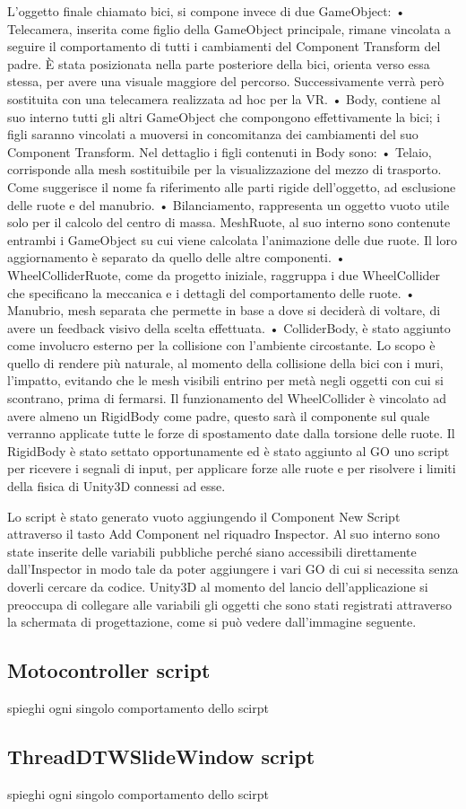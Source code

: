 L’oggetto finale chiamato bici, si compone invece di due GameObject:
• Telecamera, inserita come figlio della GameObject principale, rimane vincolata a seguire il comportamento di tutti i cambiamenti del Component Transform del padre.
È stata posizionata nella parte posteriore della bici, orienta verso essa stessa, per avere una visuale maggiore del percorso. Successivamente verrà però sostituita con una telecamera realizzata ad hoc per la VR.
• Body, contiene al suo interno tutti gli altri GameObject che compongono effettivamente la bici; i figli saranno vincolati a muoversi in concomitanza dei cambiamenti del suo Component Transform.
Nel dettaglio i figli contenuti in Body sono:
• Telaio, corrisponde alla mesh sostituibile per la visualizzazione del mezzo di trasporto. Come suggerisce il nome fa riferimento alle parti rigide dell’oggetto, ad esclusione delle ruote e del manubrio.
• Bilanciamento, rappresenta un oggetto vuoto utile solo per il calcolo del centro di massa.
MeshRuote, al suo interno sono contenute entrambi i GameObject su cui viene calcolata l’animazione delle due ruote. Il loro aggiornamento è separato da quello delle altre componenti.
• WheelColliderRuote, come da progetto iniziale, raggruppa i due WheelCollider che specificano la meccanica e i dettagli del comportamento delle ruote.
• Manubrio, mesh separata che permette in base a dove si deciderà di voltare, di avere un feedback visivo della scelta effettuata.
• ColliderBody, è stato aggiunto come involucro esterno per la collisione con l’ambiente circostante. Lo scopo è quello di rendere più naturale, al momento della collisione della bici con i muri, l’impatto, evitando che le mesh visibili entrino per metà negli oggetti con cui si scontrano, prima di fermarsi.
Il funzionamento del WheelCollider è vincolato ad avere almeno un RigidBody come padre, questo sarà il componente sul quale verranno applicate tutte le forze di spostamento date dalla torsione delle ruote.
Il RigidBody è stato settato opportunamente ed è stato aggiunto al GO uno script per ricevere i segnali di input, per applicare forze alle ruote e per risolvere i limiti della fisica di Unity3D connessi ad esse.

Lo script è stato generato vuoto aggiungendo il Component New Script attraverso il tasto Add Component nel riquadro Inspector.
Al suo interno sono state inserite delle variabili pubbliche perché siano accessibili direttamente dall’Inspector in modo tale da poter aggiungere i vari GO di cui si necessita senza doverli cercare da codice.
Unity3D al momento del lancio dell’applicazione si preoccupa di collegare alle variabili gli oggetti che sono stati registrati attraverso la schermata di progettazione, come si può vedere dall’immagine seguente.

\subsection{Motocontroller script}
spieghi ogni singolo comportamento dello scirpt
\subsection{ThreadDTWSlideWindow script}
spieghi ogni singolo comportamento dello scirpt




%
